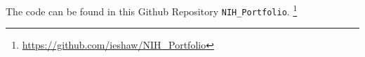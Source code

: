 The code can be found in this Github Repository \texttt{NIH\_Portfolio}. \footnote{\url{https://github.com/ieshaw/NIH_Portfolio}}
